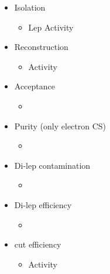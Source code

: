 \documentclass{beamer}
\begin{document}
\begin{frame}
\begin{columns}
\begin{column}{0.5\textwidth}
\begin{itemize}
        \item Isolation
   \begin{itemize}
    \item Lep \pt Activity
   \end{itemize}
   \item Reconstruction
   \begin{itemize}
    \item Activity
   \end{itemize}
   \item Acceptance
   \begin{itemize}
    \item \BTags \NJets
   \end{itemize}
   \item Purity (only electron CS)
   \begin{itemize}
    \item \MHT \NJets
   \end{itemize}
      \item Di-lep contamination
   \begin{itemize}
    \item \NJets
   \end{itemize}
   \item Di-lep efficiency
   \begin{itemize}
    \item \NJets
   \end{itemize}
   \item \mt cut efficiency
   \begin{itemize}
    \item Activity
   \end{itemize}
     \end{itemize}
    \end{column}
  \end{columns}
\end{frame}
\end{document}
